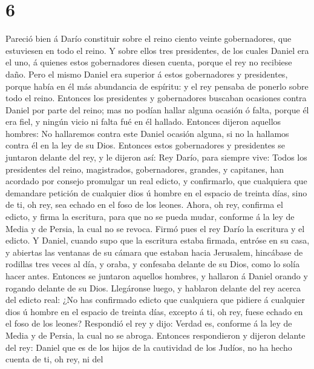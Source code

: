 \hypertarget{section-5}{%
\section{6}\label{section-5}}

 Pareció bien á Darío constituir sobre el reino ciento
veinte gobernadores, que estuviesen en todo el reino.  Y
sobre ellos tres presidentes, de los cuales Daniel era el uno, á quienes
estos gobernadores diesen cuenta, porque el rey no recibiese daño.
 Pero el mismo Daniel era superior á estos gobernadores y
presidentes, porque había en él más abundancia de espíritu: y el rey
pensaba de ponerlo sobre todo el reino.  Entonces los
presidentes y gobernadores buscaban ocasiones contra Daniel por parte
del reino; mas no podían hallar alguna ocasión ó falta, porque él era
fiel, y ningún vicio ni falta fué en él hallado.  Entonces
dijeron aquellos hombres: No hallaremos contra este Daniel ocasión
alguna, si no la hallamos contra él en la ley de su Dios. 
Entonces estos gobernadores y presidentes se juntaron delante del rey, y
le dijeron así: Rey Darío, para siempre vive:  Todos los
presidentes del reino, magistrados, gobernadores, grandes, y capitanes,
han acordado por consejo promulgar un real edicto, y confirmarlo, que
cualquiera que demandare petición de cualquier dios ú hombre en el
espacio de treinta días, sino de ti, oh rey, sea echado en el foso de
los leones.  Ahora, oh rey, confirma el edicto, y firma la
escritura, para que no se pueda mudar, conforme á la ley de Media y de
Persia, la cual no se revoca.  Firmó pues el rey Darío la
escritura y el edicto.  Y Daniel, cuando supo que la
escritura estaba firmada, entróse en su casa, y abiertas las ventanas de
su cámara que estaban hacia Jerusalem, hincábase de rodillas tres veces
al día, y oraba, y confesaba delante de su Dios, como lo solía hacer
antes.  Entonces se juntaron aquellos hombres, y hallaron á
Daniel orando y rogando delante de su Dios.  Llegáronse
luego, y hablaron delante del rey acerca del edicto real: ¿No has
confirmado edicto que cualquiera que pidiere á cualquier dios ú hombre
en el espacio de treinta días, excepto á ti, oh rey, fuese echado en el
foso de los leones? Respondió el rey y dijo: Verdad es, conforme á la
ley de Media y de Persia, la cual no se abroga.  Entonces
respondieron y dijeron delante del rey: Daniel que es de los hijos de la
cautividad de los Judíos, no ha hecho cuenta de ti, oh rey, ni del

